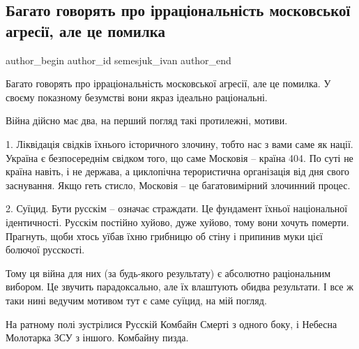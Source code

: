  
 
 
 
 
 
\subsection{Багато говорять про ірраціональність московської агресії, але це помилка}
\label{sec:08_03_2022.fb.semesjuk_ivan.1.moskov_agressia_pomylka}
 
\ifcmt
 author_begin
   author_id semesjuk_ivan
 author_end
\fi

Багато говорять про ірраціональність московської агресії, але це помилка. У
своєму показному безумстві вони якраз ідеально раціональні. 

Війна дійсно має два, на перший погляд такі протилежні, мотиви. 

1. Ліквідація свідків їхнього історичного злочину, тобто нас з вами саме як
нації. Україна є безпосереднім свідком того, що саме Московія – країна 404. По
суті не країна навіть, і не держава, а циклопічна терористична організація від
дня свого заснування. Якщо геть стисло, Московія – це багатовимірний злочинний
процес.

2. Суїцид. Бути русскім – означає страждати. Це фундамент їхньої національної
ідентичності. Русскім постійно хуйово, дуже хуйово, тому вони хочуть померти.
Прагнуть, щоби хтось уїбав їхню грибницю об стіну і припинив муки цієї болючої
русскості.

Тому ця війна для них (за будь-якого результату) є абсолютно раціональним
вибором. Це звучить парадоксально, але їх влаштують обидва результати. І все ж
таки нині ведучим мотивом тут є саме суїцид, на мій погляд. 

На ратному полі зустрілися Русскій Комбайн Смерті з одного боку, і Небесна
Молотарка ЗСУ з іншого. Комбайну пизда.

